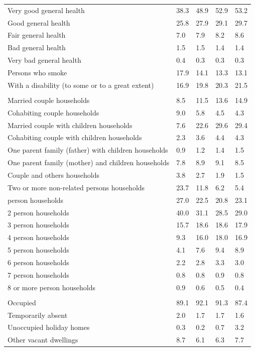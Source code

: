 \documentclass{article}
\begin{document}
\begin{table}[h]
\begin{tabular}{KTTTT}
    \hline
Very good general health & 38.3& 48.9&52.9& 53.2\\
Good general health & 25.8& 27.9& 29.1& 29.7\\
Fair general health & 7.0& 7.9&8.2& 8.6\\
Bad general health & 1.5& 1.5&1.4& 1.4\\
Very bad general health & 0.4& 0.3&0.3& 0.3\\
    \hline
Persons who smoke & 17.9& 14.1&13.3& 13.1\\
    \hline
With a disability (to some or to a great extent) & 16.9& 19.8&20.3& 21.5\\
\hline
    \\ 
    \hline
Married couple households &  8.5& 11.5& 13.6& 14.9\\
Cohabiting couple households & 9.0& 5.8& 4.5& 4.3\\
Married couple with children households &  7.6& 22.6& 29.6& 29.4\\
Cohabiting couple with children households & 2.3& 3.6& 4.4& 4.3\\
One parent family (father) with  children households & 0.9& 1.2& 1.4& 1.5\\
One parent family (mother) and children households & 7.8& 8.9& 9.1& 8.5\\
Couple and others households  & 3.8& 2.7& 1.9& 1.5\\
Two or more non-related persons households & 23.7& 11.8&  6.2&  5.4\\
     person households & 27.0& 22.5& 20.8& 23.1\\
2 person households & 40.0& 31.1& 28.5& 29.0\\
3 person households & 15.7& 18.6& 18.6& 17.9\\
4 person households &  9.3& 16.0& 18.0& 16.9\\
5 person households & 4.1& 7.6& 9.4& 8.9\\
6 person households & 2.2& 2.8& 3.3& 3.0\\
7 person households & 0.8& 0.8& 0.9& 0.8\\
8 or more person households & 0.9& 0.6& 0.5& 0.4\\
\hline
    \\ 
    \hline
Occupied & 89.1& 92.1& 91.3& 87.4\\
Temporarily absent & 2.0& 1.7& 1.7& 1.6\\
Unoccupied holiday homes & 0.3& 0.2& 0.7& 3.2\\
Other vacant dwellings & 8.7& 6.1& 6.3& 7.7\\
\hline
\end{tabular}
\end{table}
\end{document}
